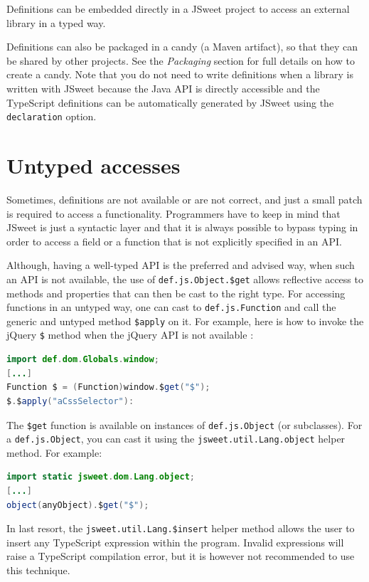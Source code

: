 \documentclass[a4paper]{report}
\begin{document}
Definitions can be embedded directly in a JSweet project to access an external library in a typed way.

Definitions can also be packaged in a candy (a Maven artifact), so that they can be shared by other projects.  See the \emph{Packaging} section for full details on how to create a candy. Note that you do not need to write definitions when a library is written with JSweet because the Java API is directly accessible and the TypeScript definitions can be automatically generated by JSweet using the \texttt{declaration} option.

\section{Untyped accesses}

Sometimes, definitions are not available or are not correct, and just a small patch is required to access a functionality. Programmers have to keep in mind that JSweet is just a syntactic layer and that it is always possible to bypass typing in order to access a field or a function that is not explicitly specified in an API.

Although, having a well-typed API is the preferred and advised way, when such an API is not available, the use of \texttt{def.\-js.\-Object.\$get} allows reflective access to methods and properties that can then be cast to the right type. For accessing functions in an untyped way, one can cast to \texttt{def.\-js.\-Function} and call the generic and untyped method \texttt{\$apply} on it.  For example, here is how to invoke the jQuery \texttt{\$} method when the jQuery API is not available :

\begin{lstlisting}[language=Java]
import def.dom.Globals.window;
[...]
Function $ = (Function)window.$get("$");
$.$apply("aCssSelector"):
\end{lstlisting}

The \texttt{\$get} function is available on instances of \texttt{def.js.Object} (or subclasses). For a \texttt{def.js.Object}, you can cast it using the \texttt{jsweet.util.Lang.object} helper method. For example:

\begin{lstlisting}[language=Java]
import static jsweet.dom.Lang.object;
[...]
object(anyObject).$get("$");
\end{lstlisting}

In last resort, the \texttt{jsweet.util.Lang.\$insert} helper method allows the user to insert any TypeScript expression within the program. Invalid expressions will raise a TypeScript compilation error, but it is however not recommended to use this technique. 
\end{document}
